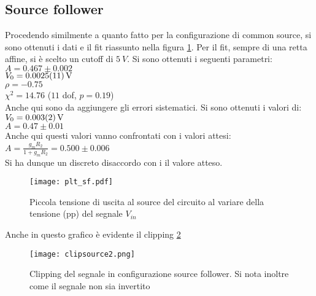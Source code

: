 \subsection{Source follower}
Procedendo similmente a quanto fatto per la configurazione di common source, si sono ottenuti i dati e il fit riassunto nella figura \ref{f:SF}. Per il fit, sempre di una retta affine, si è scelto un cutoff di $\SI{5}{V}$. Si sono ottenuti i seguenti parametri:\\
$A=0.467\pm 0.002$\\
$V_0=\SI{0.0025 \pm 0.0011}{V} $\\
$\rho=-0.75$\\
$\chi^2=14.76$ ($11$ dof, $p = 0.19$)\\

Anche qui sono da aggiungere gli errori sistematici. Si sono ottenuti i valori di:\\
$V_0=\SI{0.003 \pm 0.002}{V} $\\ 
$A=0.47\pm 0.01$ \\

Anche qui questi valori vanno confrontati con i valori attesi:\\
$A=\frac{g_mR_2}{1+g_mR_2}=0.500 \pm 0.006$\\
Si ha dunque un discreto disaccordo con i il valore atteso.

\begin{figure}[h]
	\centering
	\texttt{[image: plt\_sf.pdf]}
	\caption{Piccola tensione di uscita al source del circuito al variare della tensione (pp) del segnale $V_{in}$}
	\label{f:SF}
\end{figure}

Anche in questo grafico è evidente il clipping \ref{f:CLICF1}

\begin{figure}[h]
	\centering
	\texttt{[image: clipsource2.png]}
	\caption{Clipping del segnale in configurazione source follower. Si nota inoltre come il segnale non sia invertito}
	\label{f:CLICF1}
\end{figure}





%
